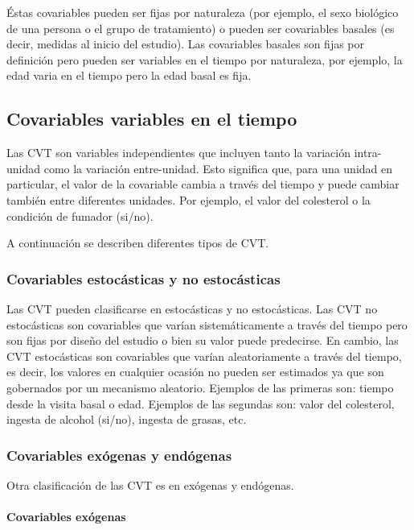 \documentclass[spanish]{article}
\numberwithin{figure}{subsection}
\numberwithin{equation}{subsection}
\numberwithin{table}{subsection}
\begin{document}
Éstas covariables pueden ser fijas por naturaleza (por ejemplo, el sexo
biológico de una persona o el grupo de tratamiento) o pueden ser covariables
basales (es decir, medidas al inicio del estudio). Las covariables basales son
fijas por definición pero pueden ser variables en el tiempo por naturaleza, por
ejemplo, la edad varia en el tiempo pero la edad basal es fija.

\subsection{Covariables variables en el tiempo}

Las CVT son variables independientes que incluyen tanto la variación
intra-unidad como la variación entre-unidad. Esto significa que, para una unidad
en particular, el valor de la covariable cambia a través del tiempo y puede
cambiar también entre diferentes unidades. Por ejemplo, el valor del colesterol
o la condición de fumador (si/no).

A continuación se describen diferentes tipos de CVT.

\subsubsection{Covariables estocásticas y no estocásticas}

Las CVT pueden clasificarse en estocásticas y no estocásticas. Las CVT no
estocásticas son covariables que varían sistemáticamente a través del tiempo
pero son fijas por diseño del estudio o bien su valor puede predecirse. En
cambio, las CVT estocásticas son covariables que varían aleatoriamente a través
del tiempo, es decir, los valores en cualquier ocasión no pueden ser estimados
ya que son gobernados por un mecanismo aleatorio. Ejemplos de las primeras son:
tiempo desde la visita basal o edad. Ejemplos de las segundas son: valor del
colesterol, ingesta de alcohol (si/no), ingesta de grasas, etc.

\subsubsection{Covariables exógenas y endógenas}
\label{seccion_de_exogeneidad}

Otra clasificación de las CVT es en exógenas y endógenas.

\paragraph{Covariables exógenas} \mbox{} \\
\end{document}
